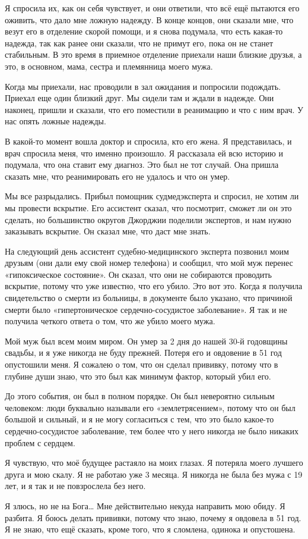 Я спросила их, как он себя чувствует, и они ответили, что всё ещё пытаются его
оживить, что дало мне ложную надежду. В конце концов, они сказали мне, что везут
его в отделение скорой помощи, и я снова подумала, что есть какая-то надежда,
так как ранее они сказали, что не примут его, пока он не станет стабильным. В
это время в приемное отделение приехали наши близкие друзья, а это, в основном,
мама, сестра и племянница моего мужа.

Когда мы приехали, нас проводили в зал ожидания и попросили подождать. Приехал
еще один близкий друг. Мы сидели там и ждали в надежде. Они наконец, пришли и
сказали, что его поместили в реанимацию и что с ним врач. У нас опять ложные
надежды.

В какой-то момент вошла доктор и спросила, кто его жена. Я представилась, и врач
спросила меня, что именно произошло. Я рассказала ей всю историю и подумала, что
она ставит ему диагноз. Это был не тот случай. Она пришла сказать мне, что
реанимировать его не удалось и что он умер.

Мы все разрыдались. Прибыл помощник судмедэксперта и спросил, не хотим ли мы
провести вскрытие. Его ассистент сказал, что посмотрит, сможет ли он это
сделать, но большинство округов Джорджии поделили экспертов, и нам нужно
заказывать вскрытие. Он сказал мне, что даст мне знать.

На следующий день ассистент судебно-медицинского эксперта позвонил моим друзьям
(они дали ему свой номер телефона) и сообщил, что мой муж перенес «гипоксическое
состояние». Он сказал, что они не собираются проводить вскрытие, потому что уже
известно, что его убило. Это вот это. Когда я получила свидетельство о смерти из
больницы, в документе было указано, что причиной смерти было «гипертоническое
сердечно-сосудистое заболевание». Я так и не получила четкого ответа о том, что
же убило моего мужа.

Мой муж был всем моим миром. Он умер за 2 дня до нашей 30-й годовщины свадьбы, и
я уже никогда не буду прежней. Потеря его и овдовение в 51 год опустошили
меня. Я сожалею о том, что он сделал прививку, потому что в глубине души знаю,
что это был как минимум фактор, который убил его.

До этого события, он был в полном порядке. Он был невероятно сильным человеком:
люди буквально называли его «землетрясением», потому что он был большой и
сильный, и я не могу согласиться с тем, что это было какое-то
сердечно-сосудистое заболевание, тем более что у него никогда не было никаких
проблем с сердцем.

Я чувствую, что моё будущее растаяло на моих глазах. Я потеряла моего лучшего
друга и мою скалу. Я не работаю уже 3 месяца. Я никогда не была без мужа с 19
лет, и я так и не повзрослела без него.

Я злюсь, но не на Бога… Мне действительно некуда направить мою обиду. Я
разбита. Я боюсь делать прививки, потому что знаю, почему я овдовела в 51 год. Я
не знаю, что ещё сказать, кроме того, что я сломлена, одинока и опустошена.
